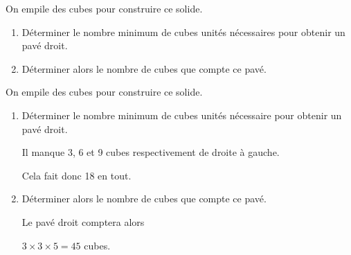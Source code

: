 \begin{exercice*}
    On empile des cubes pour construire ce solide.

    \begin{minipage}{0.2\linewidth}
    \end{minipage}
    \hfill
    \begin{minipage}{0.75\linewidth}
        \begin{enumerate}
            \item Déterminer le nombre minimum de cubes unités nécessaires pour obtenir un pavé droit.
            \item Déterminer alors le nombre de cubes que compte ce pavé.
        \end{enumerate}        
    \end{minipage}
\end{exercice*}
\begin{corrige}
    On empile des cubes pour construire ce solide.

    \begin{minipage}{0.2\linewidth}
    \end{minipage}
    \hfill
    \begin{minipage}{0.7\linewidth}
        \begin{enumerate}
            \item Déterminer le nombre minimum de cubes unités nécessaire pour obtenir un pavé droit.
            
            {\color{red} Il manque 3, 6 et 9 cubes respectivement de droite à gauche.
            
            Cela fait donc 18 en tout.}
            \item Déterminer alors le nombre de cubes que compte ce pavé.
            
            {\color{red} Le pavé droit comptera alors 
            
            $3\times 3\times 5 = 45$ cubes.
            }
        \end{enumerate}        
    \end{minipage}
\end{corrige}
